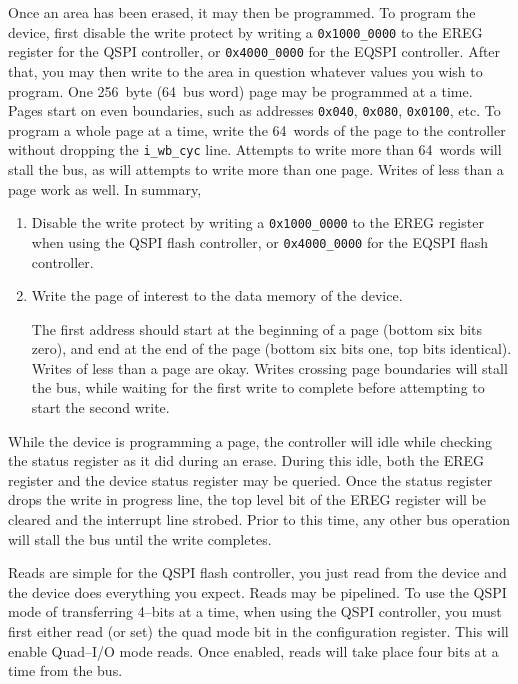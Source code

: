\documentclass{gqtekspec}
\begin{document}
Once an area has been erased, it may then be programmed.  To program the device,
first disable the write protect by writing a {\tt 0x1000\_0000} to the EREG
register for the QSPI controller, or {\tt 0x4000\_0000} for the EQSPI
controller.  After that, you may then write to the area in question whatever
values you wish to program.  One 256~byte (64~bus word) page may be programmed
at a time.  Pages start on even boundaries, such as addresses {\tt 0x040},
{\tt 0x080}, {\tt 0x0100}, etc.  To program a whole page at a time, write the
64~words of the page to the controller without dropping the {\tt i\_wb\_cyc}
line.  Attempts to write more than 64~words will stall the bus, as will
attempts to write more than one page.  Writes of less than a page work as well.
In summary,
\begin{enumerate}
\item Disable the write protect by writing a {\tt 0x1000\_0000} to the EREG
	register when using the QSPI flash controller, or {\tt 0x4000\_0000}
	for the EQSPI flash controller.
\item Write the page of interest to the data memory of the device. 

	The first address should start at the beginning of a page (bottom six
	bits zero), and end at the end of the page (bottom six bits one, top
	bits identical).  Writes of less than a page are okay.  Writes crossing
	page boundaries will stall the bus, while waiting for the first write
	to complete before attempting to start the second write.
\end{enumerate}

While the device is programming a page, the controller will idle while
checking the status register as it did during an erase.  During this idle,
both the EREG register and the device status register may be queried.  Once
the status register drops the write in progress line, the top level bit of
the EREG register will be cleared and the interrupt line strobed.  Prior to this
time, any other bus operation will stall the bus until the write completes.

Reads are simple for the QSPI flash controller, you just read from the device
and the device does everything you expect.  Reads may be pipelined.  To use
the QSPI mode of transferring 4--bits at a time, when using the QSPI controller,
you must first either read (or set) the quad mode bit in the configuration
register.  This will enable Quad--I/O mode reads.  Once enabled, reads will
take place four bits at a time from the bus.
\end{document}
